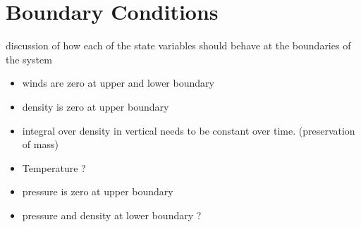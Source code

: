\section{Boundary Conditions}
discussion of how each of the state variables should behave at the boundaries of the system
\begin{itemize}
\item winds are zero at upper and lower boundary
\item density is zero at upper boundary
\item integral over density in vertical needs to be constant over time. (preservation of mass)
\item Temperature ?
\item pressure is zero at upper boundary
\item pressure and density at lower boundary ?
\end{itemize}

